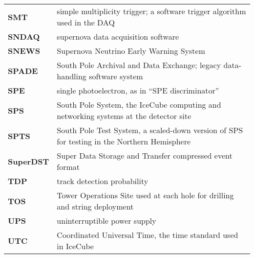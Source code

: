 \begin{longtable}{p{} p{}}
  \textbf{SMT} & simple multiplicity trigger; a software trigger algorithm
  used in the DAQ \\

  \textbf{SNDAQ} & supernova data acquisition software \\

  \textbf{SNEWS} & Supernova Neutrino Early Warning System \\

  \textbf{SPADE} & South Pole Archival and Data Exchange; legacy
  data-handling software system \\
  
  \textbf{SPE} & single photoelectron, as in ``SPE discriminator'' \\

  \textbf{SPS} & South Pole System, the IceCube computing and networking
  systems at the detector site \\

  \textbf{SPTS} & South Pole Test System, a scaled-down version of SPS for
  testing in the Northern Hemisphere \\

  \textbf{SuperDST} & Super Data Storage and Transfer compressed event
  format \\ 
  
  \textbf{TDP} & track detection probability \\

  \textbf{TOS} & Tower Operations Site used at each hole for drilling
  and string deployment \\

  \textbf{UPS} & uninterruptible power supply \\
  
  \textbf{UTC} & Coordinated Universal Time, the time standard used in
  IceCube \\
  
\end{longtable}
